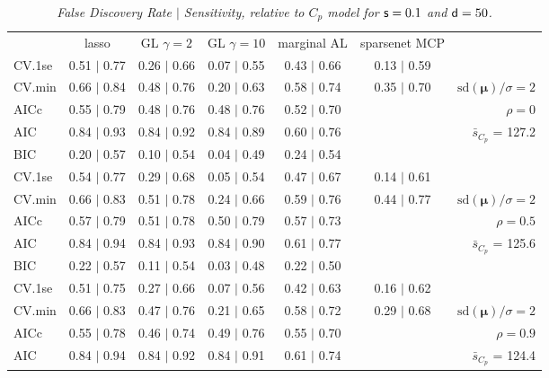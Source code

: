 \documentclass[12pt]{article}
\newcommand{\mr}[1]{\mathrm{#1}}
\newcommand{\bm}[1]{\mathbf{#1}}
\begin{document}
\begin{table}[p]\vspace{-.5cm}
\caption[l]{\label{sens}\it False Discovery Rate $\mid$ Sensitivity, relative to $C_p$ model  for ${\sf s}=0.1$ and ${\sf d}=50$.}
\vspace{-.5cm}
\small{}
\begin{center}
\begin{tabular}{l*{5}{c}|r}
 & lasso & GL $\gamma=2$ & GL $\gamma=10$ & marginal AL & sparsenet MCP  & \\
 \cline{1-7}
CV.1se & 0.51 $\mid$ 0.77 & 0.26 $\mid$ 0.66 & 0.07 $\mid$ 0.55 & 0.43 $\mid$ 0.66 & 0.13 $\mid$ 0.59 &\\
CV.min & 0.66 $\mid$ 0.84 & 0.48 $\mid$ 0.76 & 0.20 $\mid$ 0.63 & 0.58 $\mid$ 0.74 & 0.35 $\mid$ 0.70 &  $\mr{sd}(\bm{\mu})/\sigma=2$ \\
AICc & 0.55 $\mid$ 0.79 & 0.48 $\mid$ 0.76 & 0.48 $\mid$ 0.76 & 0.52 $\mid$ 0.70 & & $\rho=0$ \\
AIC & 0.84 $\mid$ 0.93 & 0.84 $\mid$ 0.92 & 0.84 $\mid$ 0.89 & 0.60 $\mid$ 0.76 & & \multirow{2}{*}{$\bar{s}_{C_p}$ = 127.2} \\
BIC & 0.20 $\mid$ 0.57 & 0.10 $\mid$ 0.54 & 0.04 $\mid$ 0.49 & 0.24 $\mid$ 0.54 & & \\
 \hline 
CV.1se & 0.54 $\mid$ 0.77 & 0.29 $\mid$ 0.68 & 0.05 $\mid$ 0.54 & 0.47 $\mid$ 0.67 & 0.14 $\mid$ 0.61 &\\
CV.min & 0.66 $\mid$ 0.83 & 0.51 $\mid$ 0.78 & 0.24 $\mid$ 0.66 & 0.59 $\mid$ 0.76 & 0.44 $\mid$ 0.77 &  $\mr{sd}(\bm{\mu})/\sigma=2$ \\
AICc & 0.57 $\mid$ 0.79 & 0.51 $\mid$ 0.78 & 0.50 $\mid$ 0.79 & 0.57 $\mid$ 0.73 & & $\rho=0.5$ \\
AIC & 0.84 $\mid$ 0.94 & 0.84 $\mid$ 0.93 & 0.84 $\mid$ 0.90 & 0.61 $\mid$ 0.77 & & \multirow{2}{*}{$\bar{s}_{C_p}$ = 125.6} \\
BIC & 0.22 $\mid$ 0.57 & 0.11 $\mid$ 0.54 & 0.03 $\mid$ 0.48 & 0.22 $\mid$ 0.50 & & \\
 \hline 
CV.1se & 0.51 $\mid$ 0.75 & 0.27 $\mid$ 0.66 & 0.07 $\mid$ 0.56 & 0.42 $\mid$ 0.63 & 0.16 $\mid$ 0.62 &\\
CV.min & 0.66 $\mid$ 0.83 & 0.47 $\mid$ 0.76 & 0.21 $\mid$ 0.65 & 0.58 $\mid$ 0.72 & 0.29 $\mid$ 0.68 &  $\mr{sd}(\bm{\mu})/\sigma=2$ \\
AICc & 0.55 $\mid$ 0.78 & 0.46 $\mid$ 0.74 & 0.49 $\mid$ 0.76 & 0.55 $\mid$ 0.70 & & $\rho=0.9$ \\
AIC & 0.84 $\mid$ 0.94 & 0.84 $\mid$ 0.92 & 0.84 $\mid$ 0.91 & 0.61 $\mid$ 0.74 & & \multirow{2}{*}{$\bar{s}_{C_p}$ = 124.4} \\

\end{tabular}
\end{center}
\end{table}
\end{document}
